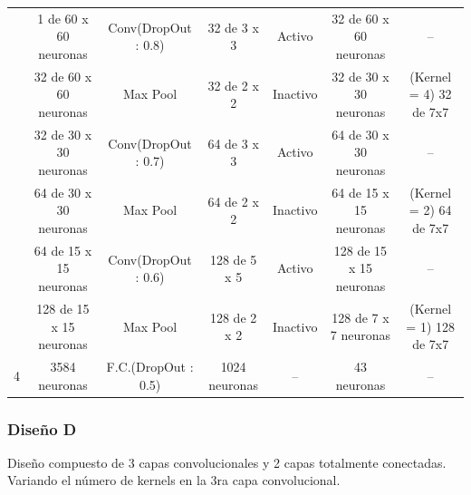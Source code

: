 \begin{itemize}
\begin{table}[H]
\begin{center}
\begin{tabular}{|>{\scriptsize}c|>{\scriptsize}c>{\scriptsize}c>{\scriptsize}c>{\scriptsize}c>{\scriptsize}c|>{\scriptsize}c|}
				 & 1 de 60 x 60 neuronas & Conv(DropOut : 0.8) & 32 de 3 x 3 & Activo & 32 de 60 x 60 neuronas & --\\ 
				\multirow{-2}{*}{1} &  32 de 60 x 60 neuronas &  Max Pool &  32 de 2 x 2 &  Inactivo & 32 de 30 x 30 neuronas & {\cellcolor[HTML]{DAE8FC}(Kernel = 4) 32 de 7x7}\\ \hline
				 & 32 de 30 x 30 neuronas & Conv(DropOut : 0.7) & {\cellcolor[HTML]{ffb3b3} 64 de 3 x 3} & Activo & 64 de 30 x 30 neuronas & --\\ 
				\multirow{-2}{*}{2} &  64 de 30 x 30 neuronas &  Max Pool &  64 de 2 x 2 &  Inactivo & 64 de 15 x 15 neuronas & {\cellcolor[HTML]{DAE8FC}(Kernel = 2) 64 de 7x7}\\ \hline			
				 & 64 de 15 x 15 neuronas & Conv(DropOut : 0.6) & 128 de 5 x 5 & Activo & 128 de 15 x 15 neuronas & --\\ 			
				\multirow{-2}{*}{3} &  128 de 15 x 15 neuronas &  Max Pool &  128 de 2 x 2 &  Inactivo & 128 de 7 x 7 neuronas & {\cellcolor[HTML]{DAE8FC} (Kernel = 1) 128 de 7x7 }\\ \hline
				4 &  {\cellcolor[HTML]{DAE8FC}3584 neuronas} &  F.C.(DropOut : 0.5) &  1024 neuronas &  -- & 43 neuronas & --\\ \hline
				\end{tabular}
				\end{center}
				\end{table}

			\end{itemize}

		\subsubsection{Diseño D} %
			
			Diseño compuesto de 3 capas convolucionales y 2 capas totalmente conectadas. Variando el número de kernels en la 3ra capa convolucional.

